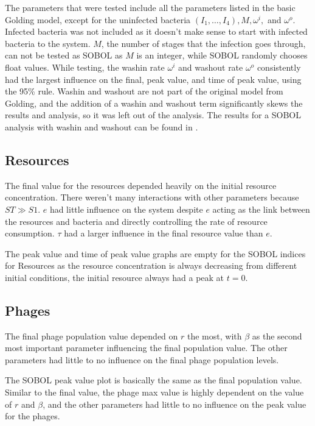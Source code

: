 The parameters that were tested include all the parameters listed in the basic Golding model, except for the uninfected bacteria $(I_1, \dots, I_4), M, \omega^i,$ and $\omega^o$. 
Infected bacteria was not included as it doesn't make sense to start with infected bacteria to the system. 
$M$, the number of stages that the infection goes through, can not be tested as SOBOL as $M$ is an integer, while SOBOL randomly chooses float values. 
While testing, the washin rate $\omega^i$ and washout rate $\omega^o$ consistently had the largest influence on the final, peak value, and time of peak value, using the 95\% rule. 
Washin and washout are not part of the original model from Golding, and the addition of a washin and washout term significantly skews the results and analysis, so it was left out of the analysis. 
The results for a SOBOL analysis with washin and washout can be found in . 

\subsection{Resources}
The final value for the resources depended heavily on the initial resource concentration. 
There weren't many interactions with other parameters because $ST \gg S1$. 
$e$ had little influence on the system despite $e$ acting as the link between the resources and bacteria and directly controlling the rate of resource consumption. 
$\tau$ had a larger influence in the final resource value than $e$. 

The peak value and time of peak value graphs are empty for the SOBOL indices for Resources as the resource concentration is always decreasing from different initial conditions, the initial resource always had a peak at $t=0$. 

\subsection{Phages}
The final phage population value depended on $r$ the most, with $\beta$ as the second most important parameter influencing the final population value. 
The other parameters had little to no influence on the final phage population levels. 

The SOBOL peak value plot is basically the same as the final population value. 
Similar to the final value, the phage max value is highly dependent on the value of $r$ and $\beta$, and the other parameters had little to no influence on the peak value for the phages. 

